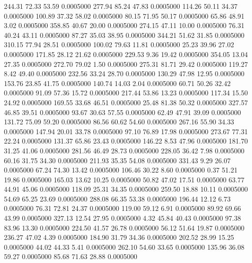  244.31   72.33   53.59   0.0005000
 277.94   85.24   47.83   0.0005000
 114.26   50.11   34.37   0.0005000
 100.89   37.32   58.02   0.0005000
  80.15   71.95   50.17   0.0005000
  65.86   48.91    3.02   0.0005000
 358.85   40.67   20.00   0.0005000
 274.15   47.11   10.00   0.0005000
  76.31   40.24   43.11   0.0005000
  87.27   35.03   38.95   0.0005000
 344.21   51.62   31.85   0.0005000
 310.15   77.94   28.51   0.0005000
 100.02   79.63   11.81   0.0005000
  25.23   39.96   27.02   0.0005000
 171.85   28.12   21.62   0.0005000
 229.53    9.36   19.42   0.0005000
 354.05   13.04   27.35   0.0005000
 272.70   79.02    1.50   0.0005000
 275.31   81.71   29.42   0.0005000
 119.27    8.42   49.40   0.0005000
 232.56   33.24   28.70   0.0005000
 130.29   47.98   12.95   0.0005000
 153.76   23.85   41.75   0.0005000
 140.74   14.03    2.04   0.0005000
  60.71   50.26   32.42   0.0005000
  91.09   57.36   15.72   0.0005000
 217.44   53.86   13.23   0.0005000
 117.34   15.50   24.92   0.0005000
 169.55   33.68   46.51   0.0005000
  25.48   81.38   50.32   0.0005000
 327.57   46.85   39.51   0.0005000
  93.67   30.63   57.55   0.0005000
  62.49   47.91   39.09   0.0005000
 131.72   75.09   59.20   0.0005000
  86.56   60.62   54.60   0.0005000
 267.16   55.90   34.33   0.0005000
 147.94   20.01   33.78   0.0005000
  97.10   76.89   17.98   0.0005000
 273.67   77.31   22.24   0.0005000
 131.37   65.86   23.43   0.0005000
 146.22    8.53   47.96   0.0005000
 181.70   31.25   41.06   0.0005000
 281.56   46.49   28.73   0.0005000
 228.05   36.42    7.98   0.0005000
  60.16   31.75   34.30   0.0005000
 211.93   35.35   54.08   0.0005000
 331.43    9.29   26.07   0.0005000
  67.24   74.30   13.42   0.0005000
 106.46   30.22    8.60   0.0005000
   0.37   51.21   19.86   0.0005000
 165.03   13.62   10.25   0.0005000
  50.82   47.02   17.51   0.0005000
  63.77   44.91   45.06   0.0005000
 118.09   25.31   34.35   0.0005000
 259.50   18.88   10.11   0.0005000
  54.69   65.25   23.69   0.0005000
 288.08   66.35   53.38   0.0005000
 196.44   12.12    6.73   0.0005000
  76.31   72.81   24.37   0.0005000
 119.00   59.12    6.91   0.0005000
  89.92   69.66   43.99   0.0005000
 327.13   12.54   27.95   0.0005000
   4.32   45.84   40.43   0.0005000
  97.38   83.96   13.30   0.0005000
 224.50   41.57   26.78   0.0005000
  56.12   51.64   19.87   0.0005000
 236.27   47.02    4.39   0.0005000
 184.90   31.79   34.36   0.0005000
 202.52   28.99   15.25   0.0005000
  44.02   44.33    5.41   0.0005000
 262.10   54.60   33.65   0.0005000
 135.96   36.08   59.27   0.0005000
  85.68   71.63   28.88   0.0005000
